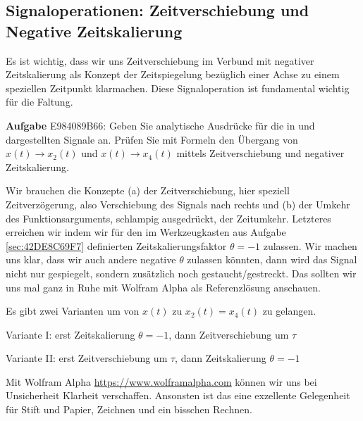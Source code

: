 \subsection{Signaloperationen: Zeitverschiebung und Negative Zeitskalierung}
\label{sec:E984089B66}
\begin{Ziel}
Es ist wichtig, dass wir uns Zeitverschiebung im Verbund mit negativer Zeitskalierung
als Konzept der Zeitspiegelung bezüglich einer Achse zu einem speziellen Zeitpunkt
klarmachen. Diese Signaloperation ist fundamental wichtig für die Faltung.
\end{Ziel}
\textbf{Aufgabe} {\tiny E984089B66}: Geben Sie analytische Ausdrücke für die in
 und  dargestellten Signale an.
Prüfen Sie mit Formeln den Übergang von $x(t) \rightarrow x_2(t)$ und
$x(t) \rightarrow x_4(t)$ mittels Zeitverschiebung und negativer Zeitskalierung.
\begin{Werkzeug}
Wir brauchen die Konzepte (a) der Zeitverschiebung, hier speziell Zeitverzögerung,
also Verschiebung des Signals nach rechts und (b) der Umkehr des Funktionsarguments,
schlampig ausgedrückt, der Zeitumkehr. Letzteres erreichen wir indem wir
für den im Werkzeugkasten aus Aufgabe \ref{sec:42DE8C69F7} definierten
Zeitskalierungsfaktor
$\theta=-1$ zulassen. Wir machen uns klar, dass wir auch andere negative
$\theta$ zulassen könnten, dann wird das Signal nicht nur gespiegelt,
sondern zusätzlich noch gestaucht/gestreckt. Das sollten wir uns mal ganz in Ruhe
mit Wolfram Alpha als Referenzlösung anschauen.
\end{Werkzeug}
\begin{Ansatz}
Es gibt zwei Varianten um von $x(t)$ zu $x_2(t)=x_4(t)$ zu gelangen.

Variante I: erst Zeitskalierung $\theta=-1$, dann Zeitverschiebung um $\tau$

Variante II: erst Zeitverschiebung um $\tau$, dann Zeitskalierung $\theta=-1$

\end{Ansatz}
\begin{ExCalc}
Mit Wolfram Alpha \url{https://www.wolframalpha.com} können wir uns bei
Unsicherheit Klarheit verschaffen.
%
Ansonsten ist das eine exzellente Gelegenheit für Stift und Papier,
Zeichnen und ein bisschen Rechnen.
\end{ExCalc}
